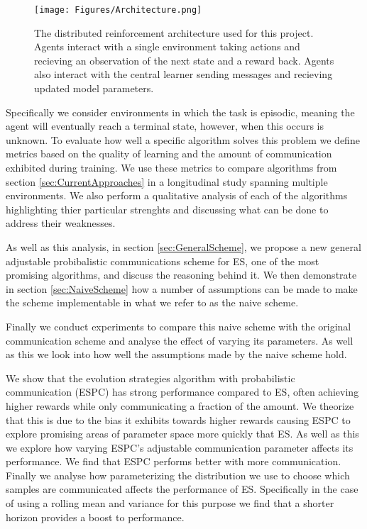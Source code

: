 \begin{figure}
    \centering
    \texttt{[image: Figures/Architecture.png]}
    \caption{The distributed reinforcement architecture used for this project. Agents interact with a single environment taking actions and recieving an observation of the next state and a reward back. Agents also interact with the central learner sending messages and recieving updated model parameters.}
    \label{fig:Architecture}
\end{figure}
Specifically we consider environments in which the task is episodic, meaning the agent will eventually reach a terminal state, however, when this occurs is unknown.
To evaluate how well a specific algorithm solves this problem we define metrics based on the quality of learning and the amount of communication exhibited during training.
We use these metrics to compare algorithms from section \ref{sec:CurrentApproaches} in a longitudinal study spanning multiple environments. We also perform a qualitative analysis of each of the algorithms highlighting thier particular strenghts and discussing what can be done to address their weaknesses.

As well as this analysis, in section \ref{sec:GeneralScheme}, we propose a new general adjustable probibalistic communications scheme for ES, one of the most promising algorithms, and discuss the reasoning behind it. We then demonstrate in section \ref{sec:NaiveScheme} how a number of assumptions can be made to make the scheme implementable in what we refer to as the naive scheme.

Finally we conduct experiments to compare this naive scheme with the original communication scheme and analyse the effect of varying its parameters. As well as this we look into how well the assumptions made by the naive scheme hold.

We show that the evolution strategies algorithm with probabilistic communication (ESPC) has strong performance compared to ES, often achieving higher rewards while only communicating a fraction of the amount. We theorize that this is due to the bias it exhibits towards higher rewards causing ESPC to explore promising areas of parameter space more quickly that ES.
As well as this we explore how varying ESPC's adjustable communication parameter affects its performance. We find that ESPC performs better with more communication. Finally we analyse how parameterizing the distribution we use to choose which samples are communicated affects the performance of ES. Specifically in the case of using a rolling mean and variance for this purpose we find that a shorter horizon provides a boost to performance.